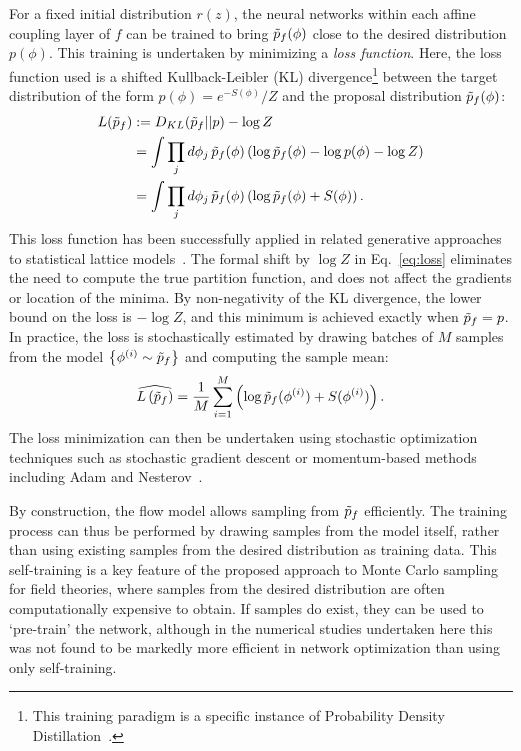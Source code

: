 For a fixed initial distribution $r(z)$, the neural networks within each affine coupling layer of $f$ can be trained to bring $\tilde{p}_f(\phi)$ close to the desired distribution $p(\phi)$. This training is undertaken by minimizing a {\it loss function}. Here, the loss function used is a shifted Kullback-Leibler (KL) divergence\footnote{This training paradigm is a specific instance of Probability Density Distillation~\cite{Oord2017WaveNet, Li2018}.
} between the target distribution of the form $p(\phi) = e^{-S(\phi)}/Z$ and the proposal distribution $\tilde{p}_f(\phi)$:
%
\begin{equation}
\begin{aligned}\label{eq:loss}
L(\tilde{p}_f) &:= D_{KL}(\tilde{p}_f || p) - \log Z \\
&= \int \prod_j d\phi_j \, \tilde{p}_f(\phi) \left(\log\tilde{p}_f(\phi) - \log p(\phi) - \log Z\right) \\
&=  \int \prod_j d\phi_j \, \tilde{p}_f(\phi) \left(\log\tilde{p}_f(\phi) + S(\phi)\right).
\end{aligned}
\end{equation}
%
This loss function has been successfully applied in related generative approaches to statistical lattice models~\cite{DBLP:journals/corr/abs-1809-10188,Li2018}. The formal shift by $\log{Z}$ in Eq.~\eqref{eq:loss} eliminates the need to compute the true partition function, and does not affect the gradients or location of the minima. By non-negativity of the KL divergence, the lower bound on the loss is $-\log{Z}$, and this minimum is achieved exactly when $\tilde{p}_f = p$.
In practice, the loss is stochastically estimated by drawing batches of $M$ samples from the model $\left\{ \phi^{(i)} \sim \tilde{p}_f \right\}$ and computing the sample mean:
%
\begin{equation}
\begin{aligned}\label{eq:loss-batch}
    \widehat{L\left(\tilde{p}_f\right)} =
    \frac{1}{M} \sum_{i=1}^M \left(\log \tilde{p}_f(\phi^{(i)}) + S(\phi^{(i)})\right).
\end{aligned}
\end{equation}
%
The loss minimization can then be undertaken using stochastic optimization techniques such as stochastic gradient descent or momentum-based methods including Adam and Nesterov~\cite{Kingma2015Adam,nesterov1983}.

By construction, the flow model allows sampling from $\tilde{p}_f$ efficiently. The training process can thus be performed by drawing samples from the model itself, rather than using existing samples from the desired distribution as training data. This self-training is a key feature of the proposed approach to Monte Carlo sampling for field theories, where samples from the desired distribution are often computationally expensive to obtain. If samples do exist, they can be used to `pre-train' the network, although in the numerical studies undertaken here this was not found to be markedly more efficient in network optimization than using only self-training.

